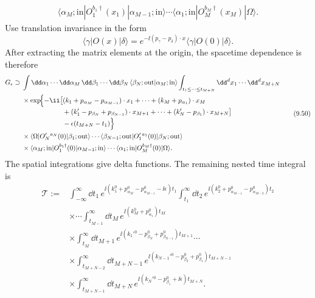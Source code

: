 \begin{enumerate}
\[\begin{split}
 \langle\alpha_M;\mathrm{in}|O_1^{b_1\dagger}(x_1)
 |\alpha_{M-1};\mathrm{in}\rangle\cdots
 \langle\alpha_1;\mathrm{in}|O_M^{b_M\dagger}(x_M)|\Omega\rangle.
\end{split}
\tag{9.48}
\]
Use translation invariance in the form
\[
 \langle\gamma|O(x)|\delta\rangle
 =e^{-\ii(p_\gamma-p_\delta)\cdot x}
  \langle\gamma|O(0)|\delta\rangle.
\tag{9.49}
\]
After extracting the matrix elements at the origin, the spacetime
dependence is therefore
\[
\begin{split}
G_\epsilon\supset{}&
 \int \dd\alpha_1\cdots \dd\alpha_M\,\dd\beta_1\cdots \dd\beta_N\,
 \langle\beta_N;\mathrm{out}|\alpha_M;\mathrm{in}\rangle
 \int_{t_1\leq\cdots\leq t_{M+N}}\dd^dx_1\cdots \dd^dx_{M+N}
\\
&\times\exp\!\Bigl\{-\ii\bigl[
 (k_1+p_{\alpha_M}-p_{\alpha_{M-1}})\cdot x_1+\cdots
 +(k_M+p_{\alpha_1})\cdot x_M
\\[-2pt]
&\hspace{60pt}
 +(k_1'-p_{\beta_N}+p_{\beta_{N-1}})\cdot x_{M+1}+\cdots
 +(k_N'-p_{\beta_1})\cdot x_{M+N}\bigr]
\\[-2pt]
&\hspace{60pt}
 -\epsilon(t_{M+N}-t_1)\Bigr\}
\\
&\times\langle\Omega|O_N'{}^{a_N}(0)|\beta_1;\mathrm{out}\rangle
 \cdots\langle\beta_{N-1};\mathrm{out}|O_1'{}^{a_1}(0)
 |\beta_N;\mathrm{out}\rangle
\\
&\times\langle\alpha_M;\mathrm{in}|O_1^{b_1\dagger}(0)
 |\alpha_{M-1};\mathrm{in}\rangle\cdots
 \langle\alpha_1;\mathrm{in}|O_M^{b_M\dagger}(0)|\Omega\rangle.
\end{split}
\tag{9.50}
\]
The spatial integrations give delta functions.  The remaining nested time
integral is
\[
\begin{split}
\mathcal T:={}&\int_{-\infty}^{\infty}\dd t_1\,
 e^{\ii(k_1^0+p_{\alpha_M}^0-p_{\alpha_{M-1}}^0-\ii\epsilon)t_1}
 \int_{t_1}^{\infty}\dd t_2\,
 e^{\ii(k_2^0+p_{\alpha_{M-1}}^0-p_{\alpha_{M-2}}^0)t_2}
\\[-2pt]
&\times\cdots
 \int_{t_{M-1}}^{\infty}\dd t_M\,
 e^{\ii(k_M^0+p_{\alpha_1}^0)t_M}
\\
&\times\int_{t_M}^{\infty}\dd t_{M+1}\,
 e^{\ii(k_1'{}^0-p_{\beta_N}^0+p_{\beta_{N-1}}^0)t_{M+1}}
 \cdots
\\[-2pt]
&\times\int_{t_{M+N-2}}^{\infty}\dd t_{M+N-1}\,
 e^{\ii(k_{N-1}'{}^0-p_{\beta_2}^0+p_{\beta_1}^0)t_{M+N-1}}
\\
&\times\int_{t_{M+N-1}}^{\infty}\dd t_{M+N}\,
 e^{\ii(k_N'{}^0-p_{\beta_1}^0+\ii\epsilon)t_{M+N}}.

\end{split}\]
\end{enumerate}
